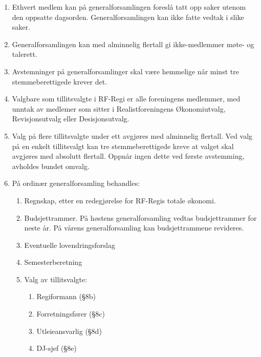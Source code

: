\documentclass[a4paper,11pt,norsk]{scrartcl}
\begin{document}
\begin{enumerate}
\item Ethvert medlem kan på generalforsamlingen foreslå tatt opp saker
utenom den oppsatte dagsorden. Generalforsamlingen kan ikke fatte
vedtak i slike saker.

\item Generalforsamlingen kan med alminnelig flertall gi ikke-medlemmer
møte- og talerett.

\item Avstemninger på generalforsamlinger skal være hemmelige når minst
tre stemmeberettigede krever det.

\item Valgbare som tillitsvalgte i RF-Regi er alle foreningens medlemmer,
med unntak av medlemer som sitter i Realistforeningens Økonomiutvalg,
Revisjonsutvalg eller Desisjonsutvalg.

\item Valg på flere tillitsvalgte under ett avgjøres med alminnelig
flertall. Ved valg på en enkelt tillitsvalgt kan tre
stemmeberettigede kreve at valget skal avgjøres med absolutt
flertall. Oppnår ingen dette ved første avstemming, avholdes bundet
omvalg.

\item På ordinær generalforsamling behandles:

\begin{enumerate}
\renewcommand{\labelenumii}{\arabic{enumii}.}
\item Regnskap, etter en redegjørelse for RF-Regis totale økonomi.

\item Budsjettrammer. På høstens generalforsamling vedtas
budsjettrammer for neste år. På vårens generalforsamling kan
budsjettrammene revideres.

\item Eventuelle lovendringsforslag

\item Semesterberetning

\item Valg av tillitsvalgte:

\begin{enumerate}
\renewcommand{\labelenumiii}{\arabic{enumiii})}
\item Regiformann (§8b)

\item Forretningsfører (§8c)

\item Utleieansvarlig (§8d)

\item DJ-sjef (§8e)
\end{enumerate}
\end{enumerate}
\end{enumerate}
\end{document}
